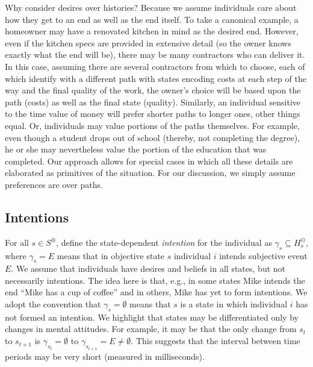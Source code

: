 \documentclass[
11pt,
titlepage,
reqno,
]{article}%
\theoremstyle{definition}
\begin{document}
  

	
Why consider desires over histories? 
Because we assume individuals care about how they get to an end as well as the end itself. 
To take a canonical example, a homeowner may have a renovated kitchen in mind as the desired end. 
However, even if the kitchen specs are provided in extensive detail (so the owner knows exactly what the end will be), there may be many contractors who can deliver it. 
In this case, assuming there are several contractors from which to choose, each of which identify with a different path with states encoding costs  at each step of the way and the final quality of the work, the owner's choice will be based upon the path (costs) as well as the final state (quality). 
Similarly, an individual sensitive to the time value of money will prefer shorter paths to longer ones, other things equal. 
Or, individuals may value portions of the paths themselves.
For example, even though a student drops out of school (thereby, not completing the degree), he or she may nevertheless value the portion of the education that was completed. 
Our approach allows for special cases in which all these details are elaborated as primitives of the situation. For our discussion, we simply assume preferences are over paths.    


	
	
\subsection{Intentions} \label{sec: intentions}
	
For all $s\in S^\oplus$, define the state-dependent \textit{intention} for the individual as $\gamma_s\subseteq H^\ominus_s$, where $\gamma_s=E$ means that in objective state $s$ individual $i$ intends subjective event $E$. 
We assume that individuals have desires and beliefs in all states, but not necessarily intentions. 
The idea here is that, e.g., in some states Mike intends the end ``Mike has a cup of coffee'' and in others, Mike has yet to form intentions.
We adopt the convention that $\gamma_s=\emptyset$ means that $s$ is a state in which individual $i$ has not formed an intention. 
We highlight that states may be differentiated only by changes in mental attitudes. 
For example, it may be that the only change from $s_t$ to $s_{t+1}$ is $\gamma_{s_t}=\emptyset$ to $\gamma_{s_{t+1}}=E\ne\emptyset$.
This suggests that the interval between time periods may be very short (measured in milliseconds).
	
\end{document}

